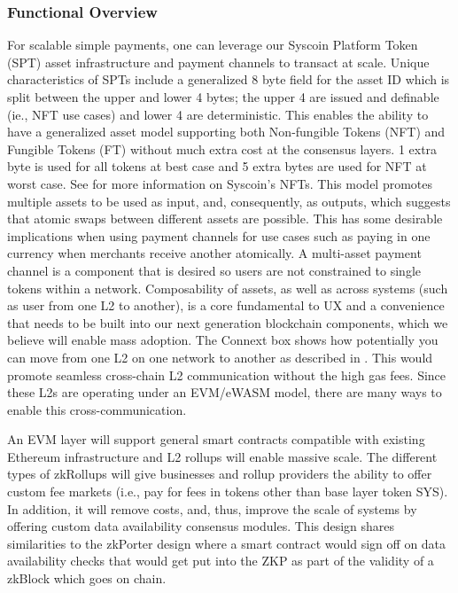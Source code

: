 \documentclass[peerreview]{ieeesyscoin}
\begin{document}
\subsubsection{Functional Overview}

For scalable simple payments, one can leverage our Syscoin Platform Token (SPT) asset infrastructure and payment channels to transact at scale. Unique characteristics of SPTs include a generalized 8 byte field for the asset ID which is split between the upper and lower 4 bytes; the upper 4 are issued and definable (ie., NFT use cases) and lower 4 are deterministic. This enables the ability to have a generalized asset model supporting both Non-fungible Tokens (NFT) and Fungible Tokens (FT) without much extra cost at the consensus layers. 1 extra byte is used for all tokens at best case and 5 extra bytes are used for NFT at worst case. See \cite{NFT21} for more information on Syscoin’s NFTs. This model promotes multiple assets to be used as input, and, consequently, as outputs, which suggests that atomic swaps between different assets are possible. This has some desirable implications when using payment channels for use cases such as paying in one currency when merchants receive another atomically. A multi-asset payment channel is a component that is desired so users are not constrained to single tokens within a network. Composability of assets, as well as across systems (such as user from one L2 to another), is a core fundamental to UX and a convenience that needs to be built into our next generation blockchain components, which we believe will enable mass adoption. The Connext box shows how potentially you can move from one L2 on one network to another as described in \cite{Bhu21}. This would promote seamless cross-chain L2 communication without the high gas fees. Since these L2s are operating under an EVM/eWASM model, there are many ways to enable this cross-communication.

An EVM layer will support general smart contracts compatible with existing Ethereum infrastructure and L2 rollups will enable massive scale. The different types of zkRollups will give businesses and rollup providers the ability to offer custom fee markets (i.e., pay for fees in tokens other than base layer token SYS). In addition, it will remove costs, and, thus, improve the scale of systems by offering custom data availability consensus modules. This design shares similarities to the zkPorter \cite{matter21} design where a smart contract would sign off on data availability checks that would get put into the ZKP as part of the validity of a zkBlock which goes on chain.
\end{document}
